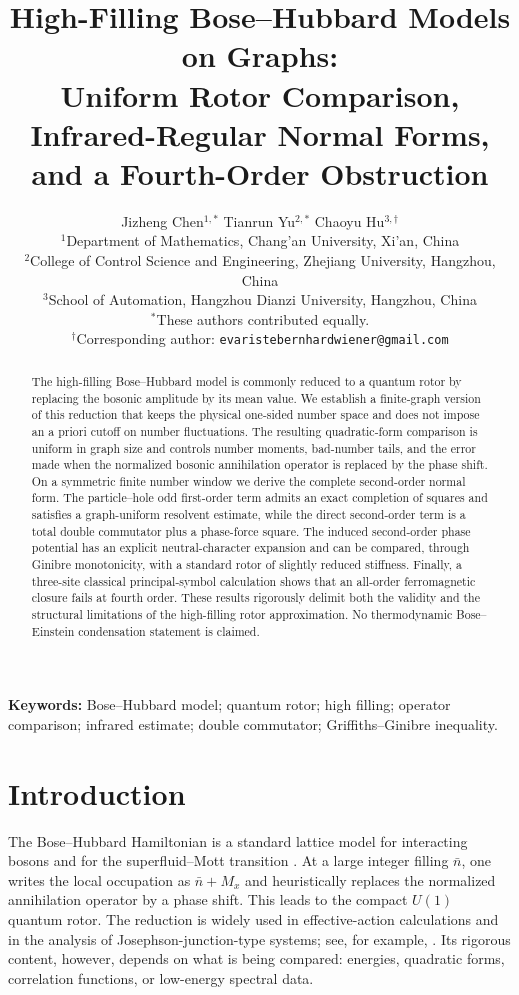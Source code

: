 \documentclass[11pt]{article}
\title{High-Filling Bose--Hubbard Models on Graphs:\\
Uniform Rotor Comparison, Infrared-Regular Normal Forms,\\
and a Fourth-Order Obstruction}
\author{
Jizheng Chen$^{1,*}$ \qquad Tianrun Yu$^{2,*}$ \qquad Chaoyu Hu$^{3,\dagger}$\\[0.7em]
\small $^1$Department of Mathematics, Chang'an University, Xi'an, China\\
\small $^2$College of Control Science and Engineering, Zhejiang University, Hangzhou, China\\
\small $^3$School of Automation, Hangzhou Dianzi University, Hangzhou, China\\[0.5em]
\small $^*$These authors contributed equally.\\
\small $^\dagger$Corresponding author: \texttt{evaristebernhardwiener@gmail.com}
}
\date{}
\newcommand{\nbar}{\bar n}
\begin{document}
\maketitle

\begin{abstract}
The high-filling Bose--Hubbard model is commonly reduced to a quantum rotor by replacing the bosonic amplitude by its mean value. We establish a finite-graph version of this reduction that keeps the physical one-sided number space and does not impose an a priori cutoff on number fluctuations. The resulting quadratic-form comparison is uniform in graph size and controls number moments, bad-number tails, and the error made when the normalized bosonic annihilation operator is replaced by the phase shift. On a symmetric finite number window we derive the complete second-order normal form. The particle--hole odd first-order term admits an exact completion of squares and satisfies a graph-uniform resolvent estimate, while the direct second-order term is a total double commutator plus a phase-force square. The induced second-order phase potential has an explicit neutral-character expansion and can be compared, through Ginibre monotonicity, with a standard rotor of slightly reduced stiffness. Finally, a three-site classical principal-symbol calculation shows that an all-order ferromagnetic closure fails at fourth order. These results rigorously delimit both the validity and the structural limitations of the high-filling rotor approximation. No thermodynamic Bose--Einstein condensation statement is claimed.
\end{abstract}

\noindent\textbf{Keywords:} Bose--Hubbard model; quantum rotor; high filling; operator comparison; infrared estimate; double commutator; Griffiths--Ginibre inequality.

\section{Introduction}

The Bose--Hubbard Hamiltonian is a standard lattice model for interacting bosons and for the superfluid--Mott transition \cite{Fisher1989}. At a large integer filling $\nbar$, one writes the local occupation as $\nbar+M_x$ and heuristically replaces the normalized annihilation operator by a phase shift. This leads to the compact $U(1)$ quantum rotor. The reduction is widely used in effective-action calculations and in the analysis of Josephson-junction-type systems; see, for example, \cite{PolakKopec2007,Teichmann2009}. Its rigorous content, however, depends on what is being compared: energies, quadratic forms, correlation functions, or low-energy spectral data.
\end{document}
